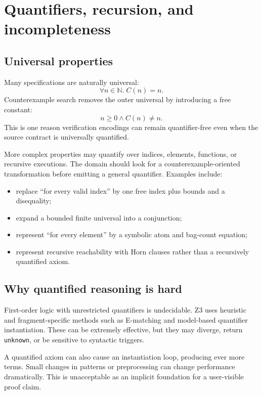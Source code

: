 \documentclass[10pt,letterpaper,oneside]{report}
\newcommand{\Nat}{\mathbb{N}}
\newcommand{\unknown}{\texttt{unknown}}
\begin{document}
\chapter{Quantifiers, recursion, and incompleteness}
\label{chap:quantifiers}

\section{Universal properties}

Many specifications are naturally universal:
\[
  \forall n\in\Nat.\;C(n)=n.
\]
Counterexample search removes the outer universal by introducing a free constant:
\[
  n\ge0\land C(n)\ne n.
\]
This is one reason verification encodings can remain quantifier-free even when the source contract is universally quantified.

More complex properties may quantify over indices, elements, functions, or recursive executions. The domain should look for a counterexample-oriented transformation before emitting a general quantifier. Examples include:

\begin{itemize}
\item replace ``for every valid index'' by one free index plus bounds and a disequality;
\item expand a bounded finite universal into a conjunction;
\item represent ``for every element'' by a symbolic atom and bag-count equation;
\item represent recursive reachability with Horn clauses rather than a recursively quantified axiom.
\end{itemize}

\section{Why quantified reasoning is hard}

First-order logic with unrestricted quantifiers is undecidable. Z3 uses heuristic and fragment-specific methods such as E-matching and model-based quantifier instantiation. These can be extremely effective, but they may diverge, return \unknown, or be sensitive to syntactic triggers.

A quantified axiom can also cause an instantiation loop, producing ever more terms. Small changes in patterns or preprocessing can change performance dramatically. This is unacceptable as an implicit foundation for a user-visible proof claim.
\end{document}
